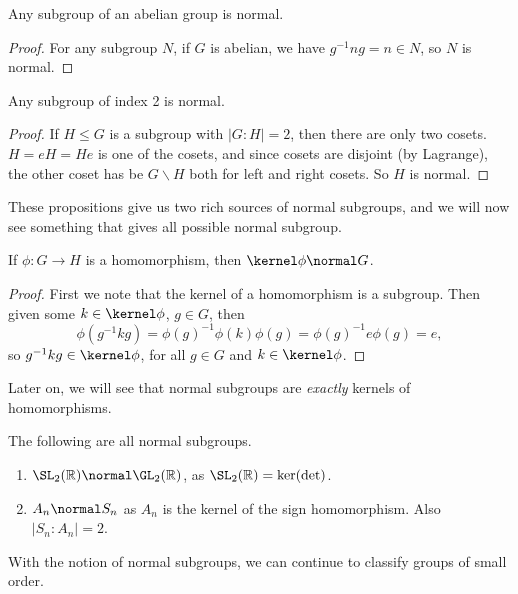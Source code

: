 \documentclass[a4paper]{scrartcl}
\begin{document}
\begin{proposition}
	Any subgroup of an abelian group is normal.
\end{proposition}
\begin{proof}
	For any subgroup $N$,
	if $G$ is abelian, we have $g^{-1}n g = n \in N$, so $N$ is normal.
\end{proof}

\begin{proposition}
	Any subgroup of index 2 is normal.
\end{proposition}
\begin{proof}
	If $H \leq G$ is a subgroup with $|G:H| = 2$, then there are only two cosets. $H = eH = He$ is one of the cosets, and since cosets are disjoint (by Lagrange), the other coset has be $G\backslash H$ both for left and right cosets. So $H$ is normal.
\end{proof}

These propositions give us two rich sources of normal subgroups, and we will now see something that gives all possible normal subgroup.

\begin{proposition}
	If $\phi : G \rightarrow H$ is a homomorphism, then $\kernel \phi \normal G$.
\end{proposition}
\begin{proof}
	First we note that the kernel of a homomorphism is a subgroup. Then given some $k \in \kernel \phi$, $g \in G$, then
	$$
	\phi(g^{-1} k g) = \phi(g)^{-1} \phi(k) \phi(g) = \phi(g)^{-1} e \phi(g) = e,
	$$
	so $g^{-1} k g \in \kernel \phi$, for all $g \in G$ and $k \in \kernel \phi$.
\end{proof}

Later on, we will see that normal subgroups are \emph{exactly} kernels of homomorphisms.

\begin{example}
	The following are all normal subgroups.
	\begin{enumerate}
		\item $\SL_2(\mathbb{R}) \normal \GL_2(\mathbb{R})$, as $\SL_2(\mathbb{R}) = \ker(\det)$.
		\item $A_n \normal S_n$ as $A_n$ is the kernel of the sign homomorphism. Also $|S_n : A_n| = 2$.
	\end{enumerate}
\end{example}

With the notion of normal subgroups, we can continue to classify groups of small order.
\end{document}

